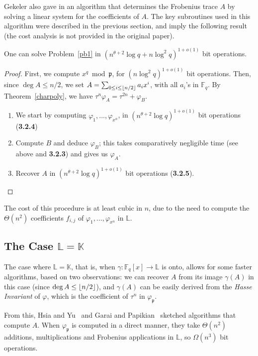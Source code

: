 \documentclass[sigconf]{acmart}
\newcommand{\K}{\mathbb{K}}
\newcommand{\F}{\mathbb{F}}
\renewcommand{\L}{\mathbb{L}}
\newcommand{\frakp}{\mathfrak{p}}
\DeclarePairedDelimiter\floor{\lfloor}{\rfloor}
\begin{document}
Gekeler also gave in \cite[Sec.~3]{frobdist} an algorithm that
determines the Frobenius trace $A$ by solving a linear system for the
coefficients of $A$. The key subroutines used in this algorithm were
described in the previous section, and imply the following result (the
cost analysis is not provided in the original paper).
\begin{proposition}\label{prop:gek}
  One can solve Problem~\ref{pb1} in $(n^{\theta+2}\log
  q + n \log^2 q)^{1+o(1)}$ bit operations.
\end{proposition}
\begin{proof}
First, we compute $x^q\bmod \frakp$, for $(n \log^2 q)^{1+o(1)}$ bit
operations. Then, since $\deg A \leq{n}/{2}$, we set $A = \sum_{0
  \le i \leq \floor*{n/2}} a_i x^i$, with all $a_i$'s in $\F_q$. By
Theorem~\ref{charpoly}, we have $\tau^n \varphi_A = \tau^{2n} +
\varphi_B.$
\begin{enumerate}
\item We start by computing $\varphi_1,\dots,\varphi_{x^n}$, in
$(n^{\theta+2} \log q)^{1+o(1)}$ bit operations ({\bf 3.2.4})
\item Compute $B$ and deduce $\varphi_B$; this takes comparatively
negligible time (see above and {\bf 3.2.3}) and gives us $\varphi_A$.
\item Recover $A$ in $(n^{\theta+2} \log q)^{1+o(1)}$
bit operations ({\bf 3.2.5}). \qedhere
\end{enumerate}
\end{proof}
The cost of this procedure is at least cubic in $n$, due to the need
to compute the $\Theta(n^2)$ coefficients $f_{i,j}$ of
$\varphi_1,\dots,\varphi_{x^n}$ in $\L$.


\subsection{The Case $\L = \K$}

The case where $\L = \K$, that is, when $\gamma: \F_q[x] \to \L$ is
onto, allows for some faster algorithms, based on two observations:
we can recover $A$ from its image $\gamma(A)$ in this case (since
 $\deg A \le \floor*{n/2}$), and $\gamma(A)$ can be easily
derived from the {\em Hasse Invariant} of $\varphi$, which is the
coefficient of $\tau^{n}$ in $\varphi_{\frakp}$.

From this, Hsia and Yu~\cite{HsYu00} and Garai and
Papikian~\cite{GaPa18} sketched algorithms that compute $A$.  When
$\varphi_{\frakp}$ is computed in a direct manner, they take
$\Theta(n^2)$ additions, multiplications and Frobenius applications in
$\L$, so $\Omega(n^3)$ bit operations.
\end{document}

